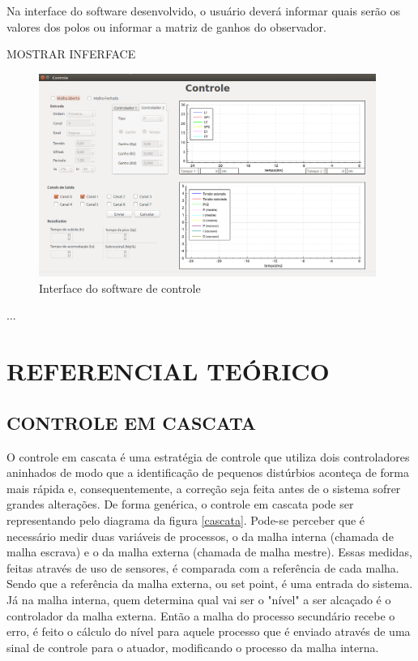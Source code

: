 \documentclass[a4paper,12pt]{article}
\begin{document}
\hspace{4ex}Na interface do software desenvolvido, o usuário deverá informar quais serão os valores dos polos ou informar a matriz de ganhos do observador.

\hspace{4ex}MOSTRAR INFERFACE
\begin{figure}[H]
\centering
\includegraphics[width=11cm]{ImagensLab4/interface-versao4.png}
\caption{Interface do software de controle}
\label{interface}
\end{figure}

...


\newpage


\thispagestyle{main}

\section{REFERENCIAL TEÓRICO}

\subsection{CONTROLE EM CASCATA}
\hspace{4ex}O controle em cascata é uma estratégia de controle que utiliza dois controladores aninhados de modo que a identificação de pequenos distúrbios aconteça de forma mais rápida e, consequentemente, a correção seja feita antes de o sistema sofrer grandes alterações. De forma genérica, o controle em cascata pode ser representando pelo diagrama da figura \ref{cascata}. Pode-se perceber que é necessário medir duas variáveis de processos, o da malha interna (chamada de malha escrava) e o da malha externa (chamada de malha mestre). Essas medidas, feitas através de uso de sensores, é comparada com a referência de cada malha. Sendo que a referência da malha externa, ou set point, é uma entrada do sistema. Já na malha interna, quem determina qual vai ser o "nível" a ser alcaçado é o controlador da malha externa. Então a malha do processo secundário recebe o erro, é feito o cálculo do nível para aquele processo que é enviado através de uma sinal de controle para o atuador, modificando o processo da malha interna.     
\end{document}
